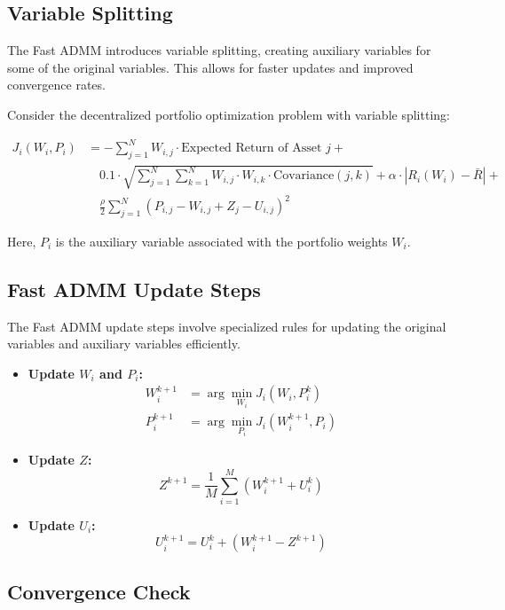 \documentclass{article}
\begin{document}
	\subsection*{Variable Splitting}
	
	The Fast ADMM introduces variable splitting, creating auxiliary variables for some of the original variables. This allows for faster updates and improved convergence rates.
	
	Consider the decentralized portfolio optimization problem with variable splitting:
	
	\[
	\begin{aligned}
		J_i(W_i, P_i) & = -\sum_{j=1}^{N} W_{i,j} \cdot \text{Expected Return of Asset } j + \\
		& \quad 0.1 \cdot \sqrt{\sum_{j=1}^{N} \sum_{k=1}^{N} W_{i,j} \cdot W_{i,k} \cdot \text{Covariance}(j, k)} + \alpha \cdot \left|R_i(W_i) - \bar{R}\right| + \\
		& \quad \frac{\rho}{2} \sum_{j=1}^{N} (P_{i,j} - W_{i,j} + Z_{j} - U_{i,j})^2
	\end{aligned}
	\]
	
	Here, $P_i$ is the auxiliary variable associated with the portfolio weights $W_i$.
	
	\subsection*{Fast ADMM Update Steps}
	
	The Fast ADMM update steps involve specialized rules for updating the original variables and auxiliary variables efficiently.
	
	\begin{itemize}
		\item \textbf{Update $W_i$ and $P_i$:}
		\[
		\begin{aligned}
			W_i^{k+1} & = \arg\min_{W_i} J_i(W_i, P_i^k) \\
			P_i^{k+1} & = \arg\min_{P_i} J_i(W_i^{k+1}, P_i)
		\end{aligned}
		\]
		
		\item \textbf{Update $Z$:}
		\[
		Z^{k+1} = \frac{1}{M} \sum_{i=1}^{M} (W_i^{k+1} + U_i^k)
		\]
		
		\item \textbf{Update $U_i$:}
		\[
		U_i^{k+1} = U_i^k + (W_i^{k+1} - Z^{k+1})
		\]
	\end{itemize}
	
	\subsection*{Convergence Check}
	
\end{document}
